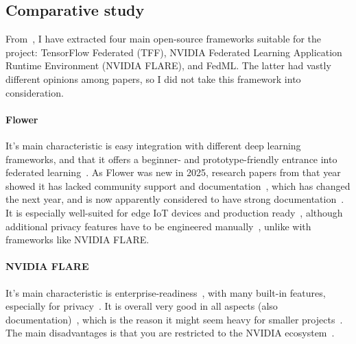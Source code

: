 \subsection{Comparative study}

From~\cite{braungardtFlowerPySyftCo2024, yurdemFederatedLearningOverview2024, riedelComparativeAnalysisOpensource2024}, I have extracted four main open-source frameworks suitable for the project: TensorFlow Federated (TFF), NVIDIA Federated Learning Application Runtime Environment (NVIDIA FLARE), and FedML. The latter had vastly different opinions among papers, so I did not take this framework into consideration.

\paragraph{Flower} It's main characteristic is easy integration with different deep learning frameworks, and that it offers a beginner- and prototype-friendly entrance into federated learning~\cite{mehdiComprehensiveReviewOpenSource2025, yurdemFederatedLearningOverview2024, rajeshkumarTop10Federated2026, guptaBenchmarkingFederatedLearning}. As Flower was new in 2025, research papers from that year showed it has lacked community support and documentation~\cite{mehdiComprehensiveReviewOpenSource2025, yurdemFederatedLearningOverview2024}, which has changed the next year, and is now apparently considered to have strong documentation~\cite{rajeshkumarTop10Federated2026}. It is especially well-suited for edge IoT devices and production ready~\cite{mehdiComprehensiveReviewOpenSource2025}, although additional privacy features have to be engineered manually~\cite{rajeshkumarTop10Federated2026}, unlike with frameworks like NVIDIA FLARE\@.

\paragraph{NVIDIA FLARE} It's main characteristic is enterprise-readiness~\cite{mehdiComprehensiveReviewOpenSource2025, cotocusTop10Federated2026, rajeshkumarTop10Federated2026, guptaBenchmarkingFederatedLearning}, with many built-in features, especially for privacy~\cite{cotocusTop10Federated2026}. It is overall very good in all aspects (also documentation)~\cite{braungardtFlowerPySyftCo2024, mehdiComprehensiveReviewOpenSource2025}, which is the reason it might seem heavy for smaller projects~\cite{rajeshkumarTop10Federated2026}. The main disadvantages is that you are restricted to the NVIDIA ecosystem~\cite{mehdiComprehensiveReviewOpenSource2025}.

